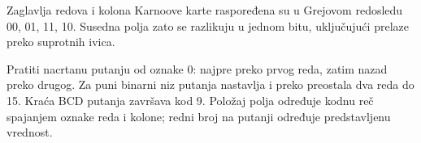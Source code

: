 Zaglavlja redova i kolona Karnoove karte raspoređena su u Grejovom redosledu 00, 01, 11, 10. Susedna polja zato se razlikuju u jednom bitu, uključujući prelaze preko suprotnih ivica.

Pratiti nacrtanu putanju od oznake 0: najpre preko prvog reda, zatim nazad preko drugog. Za puni binarni niz putanja nastavlja i preko preostala dva reda do 15. Kraća BCD putanja završava kod 9. Položaj polja određuje kodnu reč spajanjem oznake reda i kolone; redni broj na putanji određuje predstavljenu vrednost.
